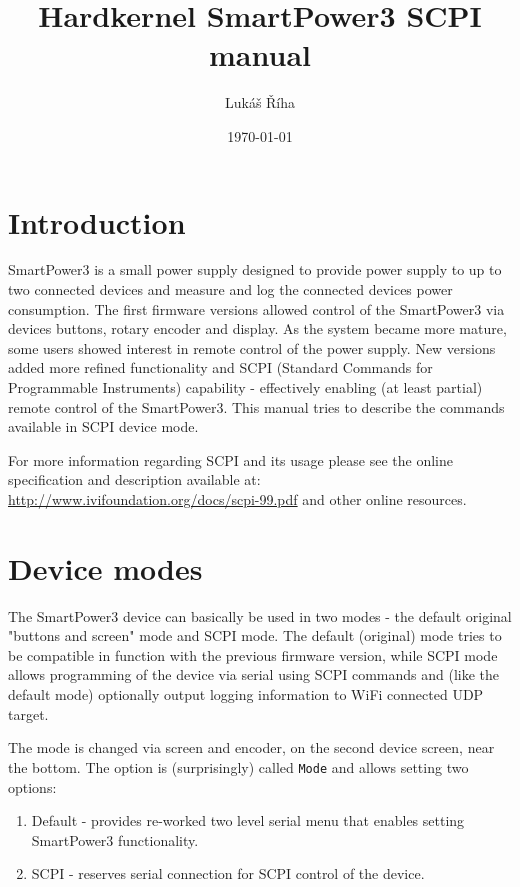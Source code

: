 \documentclass[a4paper,10pt]{article}
\title{Hardkernel SmartPower3 SCPI manual}
\author{Lukáš Říha}
\date{\today}
\begin{document}
\renewcommand{\labelenumii}{\arabic{enumi}.\arabic{enumii}}
\renewcommand{\labelenumiii}{\arabic{enumi}.\arabic{enumii}.\arabic{enumiii}}
\renewcommand{\labelenumiv}{\arabic{enumi}.\arabic{enumii}.\arabic{enumiii}.\arabic{enumiv}}

\maketitle
\newpage
\tableofcontents
\newpage


\section{Introduction}

SmartPower3 is a small power supply designed to provide power supply to up to two connected devices and measure and log the connected devices power consumption. The first firmware versions allowed control of the SmartPower3 via devices buttons, rotary encoder and display. As the system became more mature, some users showed interest in remote control of the power supply. New versions added more refined functionality and SCPI (Standard Commands for Programmable Instruments) capability - effectively enabling (at least partial) remote control of the SmartPower3. This manual tries to describe the commands available in SCPI device mode.

For more information regarding SCPI and its usage please see the online specification and description available at:
\newline
\href{http://www.ivifoundation.org/docs/scpi-99.pdf}{http://www.ivifoundation.org/docs/scpi-99.pdf}
\newline
and other online resources.

\section{Device modes}

The SmartPower3 device can basically be used in two modes - the default original "buttons and screen" mode and SCPI mode. The default (original) mode tries to be compatible in function with the previous firmware version, while SCPI mode allows programming of the device via serial using SCPI commands and (like the default mode) optionally output logging information to WiFi connected UDP target.

The mode is changed via screen and encoder, on the second device screen, near the bottom. The option is (surprisingly) called \verb|Mode| and allows setting two options:
\begin{enumerate}
    \item Default - provides re-worked two level serial menu that enables setting SmartPower3 functionality.
    \item SCPI - reserves serial connection for SCPI control of the device.
\end{enumerate}
\end{document}
